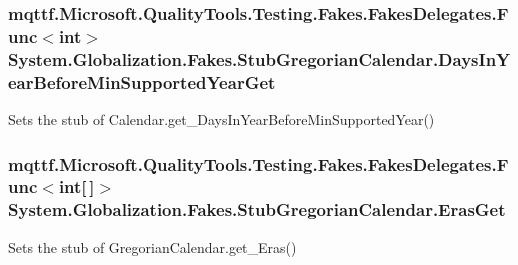 \hypertarget{class_system_1_1_globalization_1_1_fakes_1_1_stub_gregorian_calendar_aa325926bd113cf06bb4fe4c1fe69b064}{
\subsubsection[{Days\-In\-Year\-Before\-Min\-Supported\-Year\-Get}]{\setlength{\rightskip}{0pt plus 5cm}mqttf.\-Microsoft.\-Quality\-Tools.\-Testing.\-Fakes.\-Fakes\-Delegates.\-Func$<$int$>$ System.\-Globalization.\-Fakes.\-Stub\-Gregorian\-Calendar.\-Days\-In\-Year\-Before\-Min\-Supported\-Year\-Get}}\label{class_system_1_1_globalization_1_1_fakes_1_1_stub_gregorian_calendar_aa325926bd113cf06bb4fe4c1fe69b064}


Sets the stub of Calendar.\-get\-\_\-\-Days\-In\-Year\-Before\-Min\-Supported\-Year()

\hypertarget{class_system_1_1_globalization_1_1_fakes_1_1_stub_gregorian_calendar_a41cb6789d85a47a6150fc69192b14abf}{
\subsubsection[{Eras\-Get}]{\setlength{\rightskip}{0pt plus 5cm}mqttf.\-Microsoft.\-Quality\-Tools.\-Testing.\-Fakes.\-Fakes\-Delegates.\-Func$<$int\mbox{[}$\,$\mbox{]}$>$ System.\-Globalization.\-Fakes.\-Stub\-Gregorian\-Calendar.\-Eras\-Get}}\label{class_system_1_1_globalization_1_1_fakes_1_1_stub_gregorian_calendar_a41cb6789d85a47a6150fc69192b14abf}


Sets the stub of Gregorian\-Calendar.\-get\-\_\-\-Eras()

